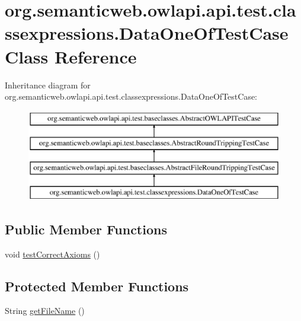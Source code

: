 \hypertarget{classorg_1_1semanticweb_1_1owlapi_1_1api_1_1test_1_1classexpressions_1_1_data_one_of_test_case}{\section{org.\-semanticweb.\-owlapi.\-api.\-test.\-classexpressions.\-Data\-One\-Of\-Test\-Case Class Reference}
\label{classorg_1_1semanticweb_1_1owlapi_1_1api_1_1test_1_1classexpressions_1_1_data_one_of_test_case}
}
Inheritance diagram for org.\-semanticweb.\-owlapi.\-api.\-test.\-classexpressions.\-Data\-One\-Of\-Test\-Case\-:\begin{figure}[H]
\begin{center}
\leavevmode
\includegraphics[height=4.000000cm]{classorg_1_1semanticweb_1_1owlapi_1_1api_1_1test_1_1classexpressions_1_1_data_one_of_test_case}
\end{center}
\end{figure}
\subsection*{Public Member Functions}
\begin{DoxyCompactItemize}
\item 
void \hyperlink{classorg_1_1semanticweb_1_1owlapi_1_1api_1_1test_1_1classexpressions_1_1_data_one_of_test_case_afce00b7d8764dadaf2156cc8c6f75298}{test\-Correct\-Axioms} ()
\end{DoxyCompactItemize}
\subsection*{Protected Member Functions}
\begin{DoxyCompactItemize}
\item 
String \hyperlink{classorg_1_1semanticweb_1_1owlapi_1_1api_1_1test_1_1classexpressions_1_1_data_one_of_test_case_a06be3b1550bab82bd1bdab5742384cc2}{get\-File\-Name} ()
\end{DoxyCompactItemize}


